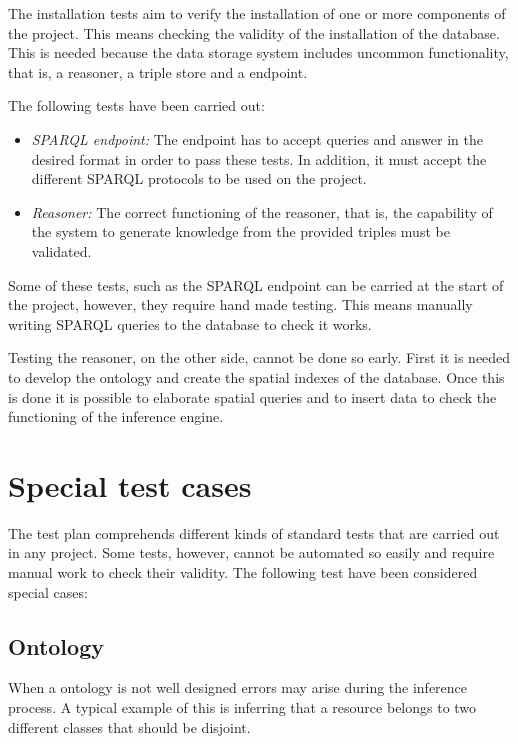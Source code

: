The installation tests aim to verify the installation of one or more components of the project. This means checking the validity of the installation of the database. This is needed because the data storage system includes uncommon functionality, that is, a reasoner, a triple store and a endpoint.

The following tests have been carried out:

\begin{itemize}
\item \textit{SPARQL endpoint:} The endpoint has to accept queries and answer in the desired format in order to pass these tests. In addition, it must accept the different SPARQL protocols to be used on the project.

\item \textit{Reasoner:} The correct functioning of the reasoner, that is, the capability of the system to generate knowledge from the provided triples must be validated.
\end{itemize}

Some of these tests, such as the SPARQL endpoint can be carried at the start of the project, however, they require hand made testing. This means manually writing SPARQL queries to the database to check it works.

Testing the reasoner, on the other side, cannot be done so early. First it is needed to develop the ontology and create the spatial indexes of the database. Once this is done it is possible to elaborate spatial queries and to insert data to check the functioning of the inference engine.

\section{Special test cases}

The test plan comprehends different kinds of standard tests that are carried out in any project. Some tests, however, cannot be automated so easily and require manual work to check their validity. The following test have been considered special cases:

\subsection{Ontology}
 
When a ontology is not well designed errors may arise during the inference process. A typical example of this is inferring that a resource belongs to two different classes that should be disjoint.

